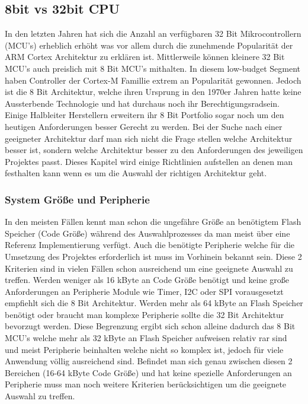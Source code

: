 \documentclass[MES,Master,ngerman]{twbook}%
\begin{document}
\subsection{8bit vs 32bit CPU}
In den letzten Jahren hat sich die Anzahl an verfügbaren 32 Bit Mikrocontrollern (MCU's) erheblich erhöht was vor allem durch die zunehmende Popularität der ARM Cortex Architektur zu erklären ist. Mittlerweile können kleinere 32 Bit MCU's auch preislich mit 8 Bit MCU's mithalten. In diesem low-budget Segment haben Controller der Cortex-M Famillie extrem an Popularität gewonnen. Jedoch ist die 8 Bit Architektur, welche ihren Ursprung in den 1970er Jahren hatte keine Aussterbende Technologie und hat durchaus noch ihr Berechtigungsradsein. Einige Halbleiter Herstellern erweitern ihr 8 Bit Portfolio sogar noch um den heutigen Anforderungen besser Gerecht zu werden. Bei der Suche nach einer geeigneter Architektur darf man sich nicht die Frage stellen welche Architektur besser ist, sondern welche Architektur besser zu den Anforderungen des jeweiligen Projektes passt. Dieses Kapitel wird einige Richtlinien aufstellen an denen man festhalten kann wenn es um die Auswahl der richtigen Architektur geht.

\subsubsection{System Größe und Peripherie}
In den meisten Fällen kennt man schon die ungefähre Größe an benötigtem Flash Speicher (Code Größe) während des Auswahlprozesses da man meist über eine Referenz Implementierung verfügt. Auch die benötigte Peripherie welche für die Umsetzung des Projektes erforderlich ist muss im Vorhinein bekannt sein. Diese 2 Kriterien sind in vielen Fällen schon ausreichend um eine geeignete Auswahl zu treffen. Werden weniger als 16 kByte an Code Größe benötigt und keine große Anforderungen an Peripherie Module wie Timer, I2C oder SPI vorausgesetzt empfiehlt sich die 8 Bit Architektur. Werden mehr als 64 kByte an Flash Speicher benötigt oder braucht man komplexe Peripherie sollte die 32 Bit Architektur bevorzugt werden. Diese Begrenzung ergibt sich schon alleine dadurch das 8 Bit MCU's welche mehr als 32 kByte an Flash Speicher aufweisen relativ rar sind und meist Peripherie beinhalten welche nicht so komplex ist, jedoch für viele Anwendung völlig ausreichend sind. Befindet man sich genau zwischen diesen 2 Bereichen (16-64 kByte Code Größe) und hat keine spezielle Anforderungen an Peripherie muss man noch weitere Kriterien berücksichtigen um die geeignete Auswahl zu treffen.
\end{document}
